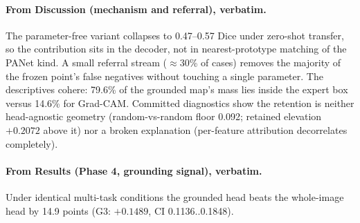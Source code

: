 \documentclass[11pt]{article}
\begin{document}
\paragraph{From Discussion (mechanism and referral), verbatim.}
The parameter-free variant collapses to 0.47--0.57 Dice under zero-shot
transfer, so the contribution sits in the decoder, not in
nearest-prototype matching of the PANet kind. A small referral stream
(${\approx}30$\% of cases) removes the majority of the frozen point's
false negatives without touching a single parameter. The descriptives
cohere: 79.6\% of the grounded map's mass lies inside the expert box
versus 14.6\% for Grad-CAM. Committed diagnostics show the retention is
neither head-agnostic geometry (random-vs-random floor 0.092; retained
elevation $+0.2072$ above it) nor a broken explanation (per-feature
attribution decorrelates completely).

\paragraph{From Results (Phase 4, grounding signal), verbatim.}
Under identical multi-task conditions the grounded head beats the
whole-image head by 14.9 points (G3: $+0.1489$, CI 0.1136..0.1848).
\end{document}
